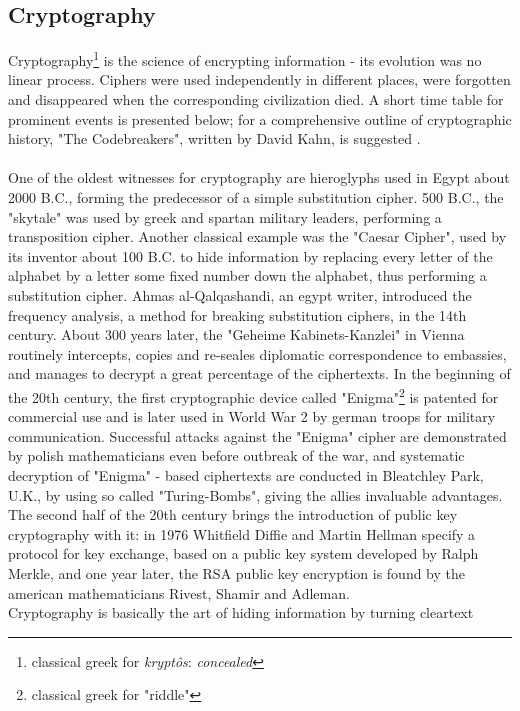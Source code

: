 \subsection{Cryptography}
Cryptography\footnote{classical greek for \textit{krypt\^{o}s}: \textit{concealed}}
is the science of encrypting information - its evolution was no linear process. Ciphers were used independently in different
places, were forgotten and disappeared when the corresponding civilization died.
A short time table for prominent events is presented below; for a comprehensive outline of cryptographic history, "The Codebreakers", written by David Kahn,
is suggested \cite{codebreakers}.
\\
\\
One of the oldest witnesses for cryptography are hieroglyphs used in Egypt about 2000 B.C., forming the predecessor
of a simple substitution cipher. 500 B.C., the "skytale" was used by greek and spartan military leaders, performing a transposition cipher. Another classical
example was the "Caesar Cipher", used by its inventor about 100 B.C. to hide information by replacing every letter of the alphabet by a letter some fixed number down the alphabet,
thus performing a substitution cipher. Ahmas al-Qalqashandi, an egypt writer, introduced the frequency analysis, a method for breaking substitution ciphers,
in the 14th century. About 300 years later, the "Geheime Kabinets-Kanzlei" in Vienna routinely intercepts, copies and 
 re-seales diplomatic correspondence to embassies, and manages to decrypt a great percentage of the ciphertexts. In the beginning of the 20th century, the 
 first cryptographic device called "Enigma"\footnote{classical greek for "riddle"} is patented for commercial use and is later used in World War 2 by german troops for 
 military communication. Successful attacks against the "Enigma" cipher are demonstrated by polish mathematicians even before outbreak of the war, and systematic
 decryption of "Enigma" - based ciphertexts are conducted in Bleatchley Park, U.K., by using so called "Turing-Bombs", giving the allies invaluable advantages.
The second half of the 20th century brings the introduction of public key cryptography with it: in 1976 Whitfield Diffie and Martin Hellman specify a 
protocol for key exchange, based on a public key system developed by Ralph Merkle, and one year later, the RSA public key encryption is found by the american
mathematicians Rivest, Shamir and Adleman.
\\
Cryptography is basically the art of hiding information by turning cleartext
